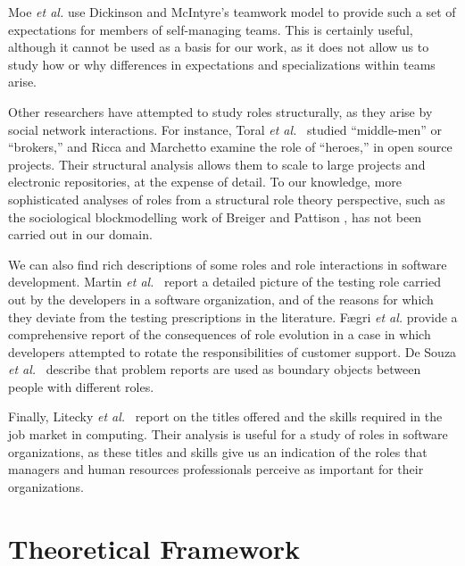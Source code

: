 \documentclass[10pt, conference, compsocconf]{IEEEtran}
\begin{document}
Moe \emph{et al.} \cite{Moe2010} use Dickinson and McIntyre's \cite{Dickinson1997} teamwork model to provide such a set of expectations for members of self-managing teams. This is certainly useful, although it cannot be used as a basis for our work, as it does not allow us to study how or why differences in expectations and specializations within teams arise.

Other researchers have attempted to study roles structurally, as they arise by social network interactions. For instance, Toral \emph{et al.}\ \cite{Toral2010} studied ``middle-men'' or ``brokers,'' and Ricca and Marchetto \cite{Ricca2010} examine the role of ``heroes,'' in open source projects. Their structural analysis allows them to scale to large projects and electronic repositories, at the expense of detail. To our knowledge, more sophisticated analyses of roles from a structural role theory perspective, such as the sociological blockmodelling work of Breiger and Pattison \cite{Breiger1986}, has not been carried out in our domain.

We can also find rich descriptions of some roles and role interactions in software development. Martin \emph{et al.}\ \cite{Martin2007} report a detailed picture of the testing role carried out by the developers in a software organization, and of the reasons for which they deviate from the testing prescriptions in the literature. F{\ae}gri \emph{et al.} \cite{Faegri2010} provide a comprehensive report of the consequences of role evolution in a case in which developers attempted to rotate the responsibilities of customer support. De Souza \emph{et al.}\ \cite{deSouza2003} describe that problem reports are used as boundary objects \cite{Bowker1999} between people with different roles.

Finally, Litecky \emph{et al.}\ \cite{Litecky2010} report on the titles offered and the skills required in the job market in computing. Their analysis is useful for a study of roles in software organizations, as these titles and skills give us an indication of the roles that managers and human resources professionals perceive as important for their organizations.




\section{Theoretical Framework}
\end{document}
